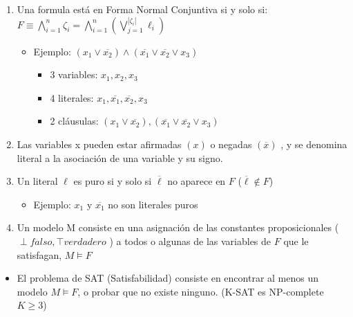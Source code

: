 \documentclass[12pt, twoside, openright]{report} %
\begin{document}
  \begin{enumerate}

  \item
    Una formula está en Forma Normal Conjuntiva si y solo si:
    \(F \equiv \bigwedge_{i=1}^{n} \zeta_i= \bigwedge_{i=1}^{n} (\bigvee_{j=1}^{\left | \zeta_i \right |} \ell_i)\)
	\vspace{-0.5cm}
    \begin{itemize}
    \item Ejemplo:
      \((x_1 \vee \overline{x_2})\wedge (\overline{x_1} \vee \overline{x_2} \vee x_3)\)

      \begin{itemize}
    
      \item
        3 variables: \(x_1, x_2, x_3\)
      \item
        4 literales: \(x_1,\overline{x_1}, \overline{x_2}, x_3\)
      \item
        2 cláusulas:
        \((x_1 \vee \overline{x_2}),(\overline{x_1} \vee \overline{x_2} \vee x_3)\)
      \end{itemize}
    \end{itemize}
  \item
    Las variables x pueden estar afirmadas \((x)\) o negadas
    \((\overline{x})\) , y se denomina literal a la asociación de una
    variable y su signo.
  \item
    Un literal \(\ell\) es puro si y solo si \(\overline{\ell}\) no
    aparece en \(F\) (\(\overline{\ell} \notin F\))

    \begin{itemize}
  
    \item
      Ejemplo: \(x_1\) y \(\overline{x_1}\) no son literales puros
    \end{itemize}
  \item
    Un modelo M consiste en una asignación de las constantes
    proposicionales (\(\perp falso,\top verdadero\) ) a todos o algunas
    de las variables de \(F\) que le satisfagan, \(M \models F\)
  \end{enumerate}

  \begin{itemize}

  \item
    El problema de SAT (Satisfabilidad) consiste en encontrar al menos
    un modelo \(M \models F\), o probar que no existe ninguno. (K-SAT es
    NP-complete \(K \geq 3\))
  \end{itemize}
  \vspace{-0.5cm}
\end{document}
